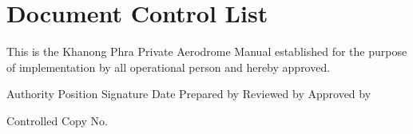 \chapter*{Document Control List}
This is the Khanong Phra Private Aerodrome Manual established for the purpose of implementation by all operational person and hereby approved.


Authority		Position		Signature		Date
Prepared by
Reviewed by
Approved by


Controlled Copy No.

